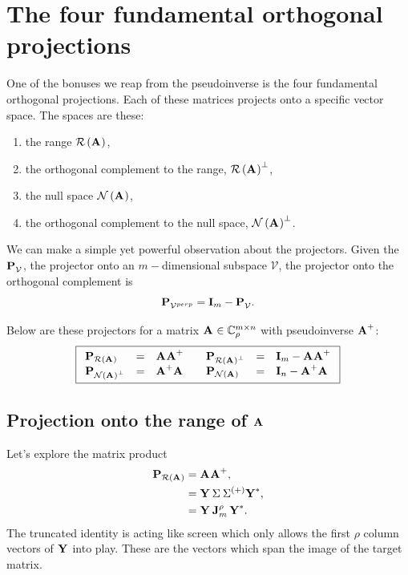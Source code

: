\section[The fundamental projections]{The four fundamental orthogonal projections}
\label{sec:orthproj}

One of the bonuses we reap from the pseudoinverse is the four fundamental orthogonal projections. Each of these matrices projects onto a specific vector space. The spaces are these:
\begin{enumerate}
\item the range $\mathcal{R}\left( \textbf{A}^{\mathrm{}} \right)$,
\item the orthogonal complement to the range, $\mathcal{R}\left( \textbf{A}^{\mathrm{}} \right)^{\perp}$,
\item the null space $\mathcal{N}\left( \textbf{A}^{\mathrm{}} \right)$,
\item the orthogonal complement to the null space, $\mathcal{N}\left( \textbf{A}^{\mathrm{}} \right)^{\perp}$.
\end{enumerate}

We can make a simple yet powerful observation about the projectors.
Given the $\textbf{P}^{\mathrm{}}_{\mathcal{V}}$, the projector onto an $m-$dimensional subspace $\mathcal{V}$, the projector onto the orthogonal complement is
\begin{equation}
  \textbf{P}^{\mathrm{}}_{\mathcal{V}^{perp}} = \textbf{I}_{m}-\textbf{P}^{\mathrm{}}_{\mathcal{V}}.
\end{equation}

Below are these projectors for a matrix $\textbf{A}^{\mathrm{}}\in\mathbb{C}^{m \times n}_{\rho}$ with pseudoinverse $\operatorname{\textbf{A}^{\mathrm{+}}}$:
\begin{equation}
\boxed{
  \begin{array}{lcllcl}
    \projra& = &\rightinv & \quad \projrap& = &\I{m}-\rightinv\\
    \projnap& =& \leftinv & \quad \projna& = &\I{n}-\leftinv\\    
  \end{array}
  }
  \label{eq:fourprojpi}
\end{equation}

\subsection{Projection onto the range of $\textbf{A}^{\mathrm{}}$}
Let's explore the matrix product
\begin{equation}
  \begin{split}
    \operatorname{\mathbf{P}_{\mathcal{R}\left( \textbf{A}^{\mathrm{}} \right)}} &= \operatorname{\textbf{A}^{\mathrm{}}\textbf{A}^{\mathrm{+}}},\\
    &= \textbf{Y}^{\mathrm{}}\,\Sigma^{\mathrm{}}\,\Sigma^{\mathrm{(+)}}\textbf{Y}^{\mathrm{*}},\\
    & = \textbf{Y}^{\mathrm{}}\,\textbf{J}^{\rho}_{m}\,\textbf{Y}^{\mathrm{*}}.
  \end{split}
\end{equation}
The truncated identity is acting like screen which only allows the first $\rho$ column vectors of $\textbf{Y}^{\mathrm{}}$ into play. These are the vectors which span the image of the target matrix.

